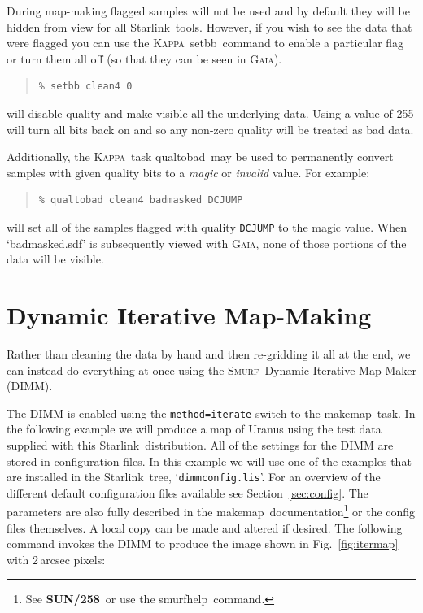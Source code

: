 \documentclass[twoside,11pt]{article}
\newcommand{\htmladdnormallink}[2]{#1}
\newcommand{\xref}[3]{#1}
\newcommand{\xlabel}[1]{}
\renewcommand{\_}{\texttt{\symbol{95}}}
\newenvironment{myquote}{\begin{quote}\begin{small}}{\end{small}\end{quote}}
\newcommand{\starlink}{\htmladdnormallink{Starlink}{http://starlink.jach.hawaii.edu}}
\newcommand{\Kappa}{\xref{\textsc{Kappa}}{sun95}{}}
\newcommand{\gaia}{\xref{\textsc{Gaia}}{sun214}{}}
\newcommand{\smurf}{\xref{\textsc{Smurf}}{sun258}{}}
\newcommand{\task}[1]{\textsf{#1}}
\newcommand{\makemap}{\xref{\task{makemap}}{sun258}{MAKEMAP}}
\newcommand{\smurfhelp}{\xref{\task{smurfhelp}}{sun258}{SMURFHELP}}
\newcommand{\smurfsun}{\xref{\textbf{SUN/258}}{sun258}{}}
\newcommand{\qualtobad}{\xref{\task{qualtobad}}{sun95}{QUALTOBAD}}
\newcommand{\setbb}{\xref{\task{setbb}}{sun95}{SETBB}}
\begin{document}
During map-making flagged samples will not be used and by default they
will be hidden from view for all \starlink\ tools. However, if you
wish to see the data that were flagged you can use the \Kappa\
\setbb\ command to enable a particular flag or turn them all off (so
that they can be seen in \gaia).

\begin{myquote}
\begin{verbatim}
% setbb clean4 0
\end{verbatim}
\end{myquote}

will disable quality and make visible all the underlying data. Using a
value of 255 will turn all bits back on and so any non-zero quality will be
treated as bad data.

Additionally, the \Kappa\ task \qualtobad\ may be used to permanently
convert samples with given quality bits to a {\em magic\/} or {\em
  invalid\/} value. For example:

\begin{myquote}
\begin{verbatim}
% qualtobad clean4 badmasked DCJUMP
\end{verbatim}
\end{myquote}
%
will set all of the samples flagged with quality \texttt{DCJUMP} to the
magic value. When `badmasked.sdf' is subsequently viewed with \gaia, none
of those portions of the data will be visible.

\section{\xlabel{maps}Dynamic Iterative Map-Making}
\label{sec:maps}

Rather than cleaning the data by hand and then re-gridding it all at
the end, we can instead do everything at once using the
\smurf\ Dynamic Iterative Map-Maker (DIMM).

The DIMM is enabled using the \texttt{method=iterate} switch to the
\makemap\ task. In the following example we will produce a map of
Uranus using the test data supplied with this \starlink\
distribution. All of the settings for the DIMM are stored in
configuration files.  In this example we will use one of the examples
that are installed in the \starlink\ tree,
`\texttt{dimmconfig.lis}'. For an overview of the different default
configuration files available see Section~\ref{sec:config}. The
parameters are also fully described in the \makemap\
documentation\footnote{See \smurfsun\ or use the \smurfhelp\ command.}
or the config files themselves. A local copy can be made and altered
if desired. The following command invokes the DIMM to produce the
image shown in Fig.~\ref{fig:itermap} with 2\,arcsec pixels:
\end{document}
